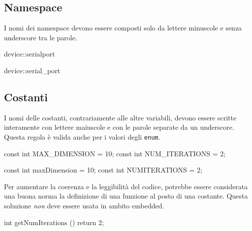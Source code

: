 \subsection{Namespace}\label{ssec:namespacename}

I nomi dei namespace devono essere composti solo da lettere minuscole e senza underscore tra le parole\cite{codestyle:geotechnical}.

\begin{minipage}[t]{\cbwidth}
\begin{RightCode}
device::serialport
\end{RightCode}
\end{minipage}%
\hspace{\cbdistance}
\begin{minipage}[t]{\cbwidth}
\begin{ErrorCode}
device::serial_port
\end{ErrorCode}
\end{minipage}

\subsection{Costanti}\label{ssec:constantname}

I nomi delle costanti, contrariamente alle altre variabili, devono essere scritte interamente con lettere maiuscole e con le parole separate da un underscore\cite{codestyle:geotechnical}.
Questa regola è valida anche per i valori degli \texttt{enum}.

\begin{minipage}[t]{\cbwidth}
\begin{RightCode}
const int MAX_DIMENSION = 10;
const int NUM_ITERATIONS = 2;
\end{RightCode}
\end{minipage}%
\hspace{\cbdistance}
\begin{minipage}[t]{\cbwidth}
\begin{ErrorCode}
const int maxDimension = 10;
const int NUMITERATIONS = 2;
\end{ErrorCode}
\end{minipage}

Per aumentare la coerenza e la leggibilità del codice, potrebbe essere considerata una buona norma la definizione di una funzione al posto di una costante\cite{codestyle:geotechnical}.
Questa soluzione \emph{non} deve essere usata in ambito embedded.

\begin{minipage}[t]{\rbwidth}
\begin{RightCode}
int
getNumIterations ()
{
	return 2;
}
\end{RightCode}
\end{minipage}

